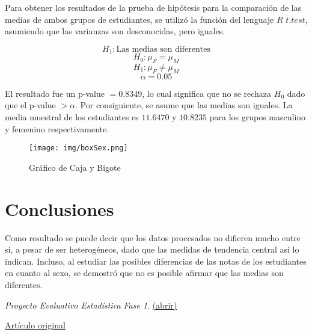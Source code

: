 \documentclass[a4paper,10pt,twocolumn]{article}
\begin{document}
	Para obtener los resultados de la prueba de hipótesis para la comparación de las medias de ambos grupos de estudiantes, se utilizó la función del lenguaje $R$ $t.test$, asumiendo que las varianzas son desconocidas, pero iguales.
	
	$$H_1: \text{Las medias son diferentes}$$
	$$H_0: \mu_F = \mu_M$$
	$$H_1: \mu_F \neq \mu_M$$
	$$\alpha = 0.05$$
	
	El resultado fue un p-value $= 0.8349$, lo cual significa que no se rechaza $H_0$ dado que el p-value $> \alpha$. Por consiguiente, se asume que las medias son iguales. La media muestral de los estudiantes es $11.6470$ y $10.8235$ para los grupos masculino y femenino respectivamente.

		\begin{figure}[htb]%
		\begin{center}
			\hspace{-1.3cm}\texttt{[image: img/boxSex.png]}
		\end{center}
		\caption{Gráfico de Caja y Bigote \label{fig:box}}%
		\end{figure}

\section{Conclusiones}\label{sec:conc}

  Como resultado se puede decir que los datos procesados no difieren mucho entre sí, a pesar de ser heterogéneos, dado que las medidas de tendencia central así lo indican. Incluso, al estudiar las posibles diferencias de las notas de los estudiantes en cuanto al sexo, se demostró que no es posible afirmar que las medias son diferentes.




\begin{thebibliography}{99}
	 \emph{Proyecto Evaluativo Estadística Fase 1}. \href{resources/orientacion.pdf}{(abrir)}

	 \href{../docs/student.pdf}{Artículo original}


\end{thebibliography}


\label{end}
\end{document}
